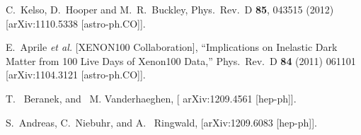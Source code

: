   C.~Kelso, D.~Hooper and M.~R.~Buckley,
  Phys.\ Rev.\ D {\bf 85}, 043515 (2012)
  [arXiv:1110.5338 [astro-ph.CO]].

E.~Aprile {\it et al.} [XENON100 Collaboration],
``Implications on Inelastic Dark Matter from 100 Live Days of Xenon100 Data,''
Phys.\ Rev.\ D {\bf 84} (2011) 061101
[arXiv:1104.3121 [astro-ph.CO]].

T. ~Beranek, and ~M. Vanderhaeghen, [	arXiv:1209.4561 [hep-ph]].

S.~Andreas, C.~Niebuhr, and A. ~Ringwald,  [arXiv:1209.6083 [hep-ph]].



